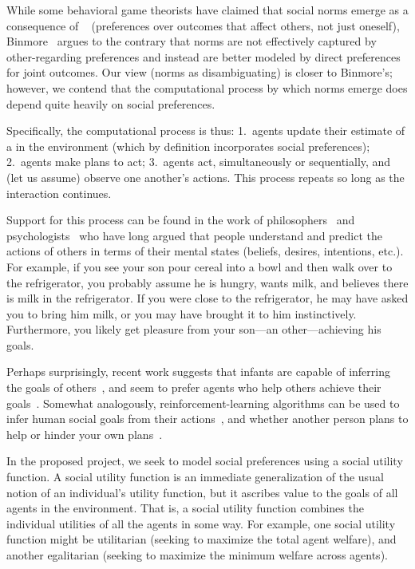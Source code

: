 While some behavioral game theorists have claimed that social norms
emerge as a consequence of ~\cite{fehr1999theory} (preferences over outcomes that
affect others, not just oneself), Binmore~\cite{binmore2010social}
argues to the contrary that norms are not effectively captured by
other-regarding preferences and instead are better modeled by direct
preferences for joint outcomes.  Our view (norms as disambiguating) is
closer to Binmore's; however, we contend that the computational
process by which norms emerge does depend quite heavily on social
preferences.



Specifically, the computational process is thus:
1.~agents update their estimate of a  in the environment
(which by definition incorporates social preferences);
2.~agents make plans to act;
3.~agents act, simultaneously or sequentially, and (let us assume) observe one another's actions.
This process repeats so long as the interaction continues.

Support for this process can be found in the work of
philosophers~\cite{dennett87} and psychologists~\cite{heider44} who
have long argued that people understand and predict the actions of
others in terms of their mental states (beliefs, desires, intentions,
etc.).  For example, if you see your son pour cereal into a bowl and
then walk over to the refrigerator, you probably assume he is hungry,
wants milk, and believes there is milk in the refrigerator. If you
were close to the refrigerator, he may have asked you to bring him
milk, or you may have brought it to him instinctively. Furthermore,
you likely get pleasure from your son---an other---achieving his goals.

Perhaps surprisingly, recent work suggests that infants are capable of
inferring the goals of others~\cite{gergely95}, and seem to prefer
agents who help others achieve their goals~\cite{hamlin13,hamlin07}.
Somewhat analogously, reinforcement-learning algorithms can be
used to infer human social goals from their actions~\cite{baker09},
and whether another person plans to help or hinder your own
plans~\cite{ullman09}.

In the proposed project, we seek to model social preferences using a
social utility function.  A social utility function is an immediate
generalization of the usual notion of an individual's utility
function, but it ascribes value to the goals of all agents in the
environment.  That is, a social utility function combines the
individual utilities of all the agents in some way.  For example, one
social utility function might be utilitarian (seeking to maximize the
total agent welfare), and another egalitarian (seeking to maximize the
minimum welfare across agents).

